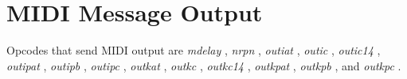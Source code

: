 \begin{comment}
\documentclass[10pt]{article}
\usepackage{fullpage, graphicx, url}
\setlength{\parskip}{1ex}
\setlength{\parindent}{0ex}
\title{MIDI Message Output}



\begin{tabular}{ccc}
The Alternative Csound Reference Manual & & \\
Previous &MIDI Support &Next

\end{tabular}

\end{comment}
\section{MIDI Message Output}


  Opcodes that send MIDI output are \emph{mdelay}
, \emph{nrpn}
, \emph{outiat}
, \emph{outic}
, \emph{outic14}
, \emph{outipat}
, \emph{outipb}
, \emph{outipc}
, \emph{outkat}
, \emph{outkc}
, \emph{outkc14}
, \emph{outkpat}
, \emph{outkpb}
, and \emph{outkpc}
. 


\begin{comment}
\begin{tabular}{lcr}
Previous &Home &Next \\
Note-on/Note-off &Up &Real-time Messages

\end{tabular}



\end{comment}
